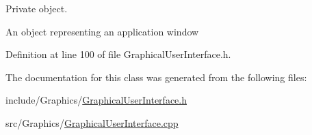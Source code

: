 Private object. 

An object representing an application window 

Definition at line 100 of file Graphical\+User\+Interface.\+h.



The documentation for this class was generated from the following files\+:\begin{DoxyCompactItemize}
\item 
include/\+Graphics/\hyperlink{GraphicalUserInterface_8h}{Graphical\+User\+Interface.\+h}\item 
src/\+Graphics/\hyperlink{GraphicalUserInterface_8cpp}{Graphical\+User\+Interface.\+cpp}\end{DoxyCompactItemize}
